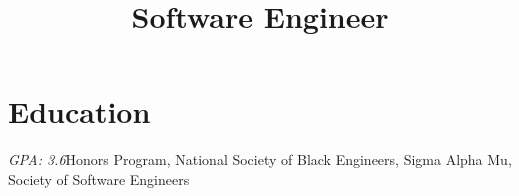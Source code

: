 \documentclass[11pt,a4paper,sans]{moderncv}        %
\title{Software Engineer}                               %
\begin{document}
\makecvtitle

\section{Education}
{\textit{GPA: 3.6}}{Honors Program,  National Society of Black Engineers, Sigma Alpha Mu, Society of Software Engineers}  %


\end{document}
